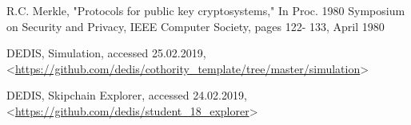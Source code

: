 \begin{thebibliography}{9}
 R.C. Merkle, "Protocols for public key cryptosystems," In Proc. 1980
Symposium on Security and Privacy, IEEE Computer Society, pages 122-
133, April 1980

 DEDIS, Simulation, accessed 25.02.2019, <\url{https://github.com/dedis/cothority\_template/tree/master/simulation}>

 DEDIS, Skipchain Explorer, accessed 24.02.2019, <\url{https://github.com/dedis/student\_18\_explorer}> 










\end{thebibliography}